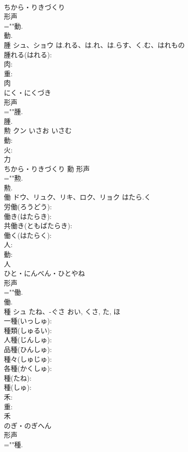 \documentclass[8pt]{extreport}
\begin{document}
\begin{CJK}{UTF8}{min}
\\	ちから・りきづくり	
\\	形声 
\\	=""動.
\\	動.
\\	腫	シュ、ショウ	は.れる、は.れ、は.らす、く.む、はれもの		
\\	腫れる(はれる): 
\\	肉: 
\\	重: 
\\	肉	
\\	にく・にくづき	
\\	形声 
\\	=""腫.
\\	腫.
\\	勲	クン	いさお	いさむ	
\\	動: 
\\	火: 
\\	力	
\\	ちから・りきづくり	勳	形声 
\\	=""勲.
\\	勲.
\\	働	ドウ、リュク、リキ、ロク、リョク	はたら.く		
\\	労働(ろうどう): 
\\	働き(はたらき): 
\\	共働き(ともばたらき): 
\\	働く(はたらく): 
\\	人: 
\\	動: 
\\	人	
\\	ひと・にんべん・ひとやね	
\\	形声 
\\	=""働.
\\	働.
\\	種	シュ	たね、-ぐさ	おい, くさ, た, ほ	
\\	一種(いっしゅ): 
\\	種類(しゅるい): 
\\	人種(じんしゅ): 
\\	品種(ひんしゅ): 
\\	種々(しゅじゅ): 
\\	各種(かくしゅ): 
\\	種(たね): 
\\	種(しゅ): 
\\	禾: 
\\	重: 
\\	禾	
\\	のぎ・のぎへん	
\\	形声 
\\	=""種.

\end{CJK}
\end{document}
